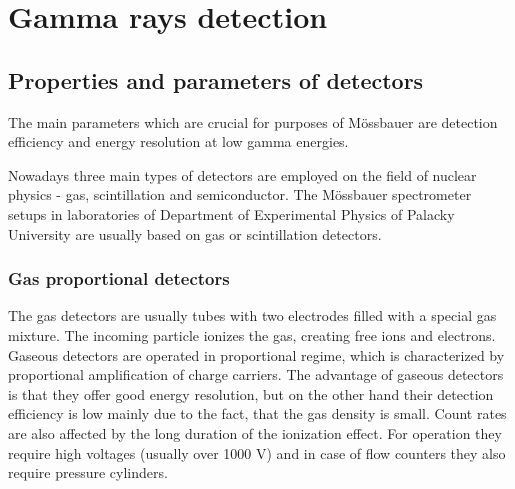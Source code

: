 
\chapter{Gamma rays detection}


\section{Properties and parameters of detectors}
The main parameters which are crucial for purposes of Mössbauer are detection efficiency and energy resolution at low gamma energies.
\par
Nowadays three main types of detectors are employed on the field of nuclear physics - gas, scintillation and semiconductor.
The Mössbauer spectrometer setups in laboratories of Department of Experimental Physics of Palacky University are usually based on gas or scintillation detectors.


\subsection{Gas proportional detectors}
The gas detectors are usually tubes with two electrodes filled with a special gas mixture. The incoming particle ionizes the gas, creating free ions and electrons. Gaseous detectors are operated in proportional regime, which is characterized by proportional amplification of charge carriers. The advantage of gaseous detectors is that they offer good energy resolution, but on the other hand their detection efficiency is low mainly due to the fact, that the gas density is small. Count rates are also affected by the long duration of the ionization effect. For operation they require high voltages (usually over 1000 V) and in case of flow counters they also require pressure cylinders. 

% 


